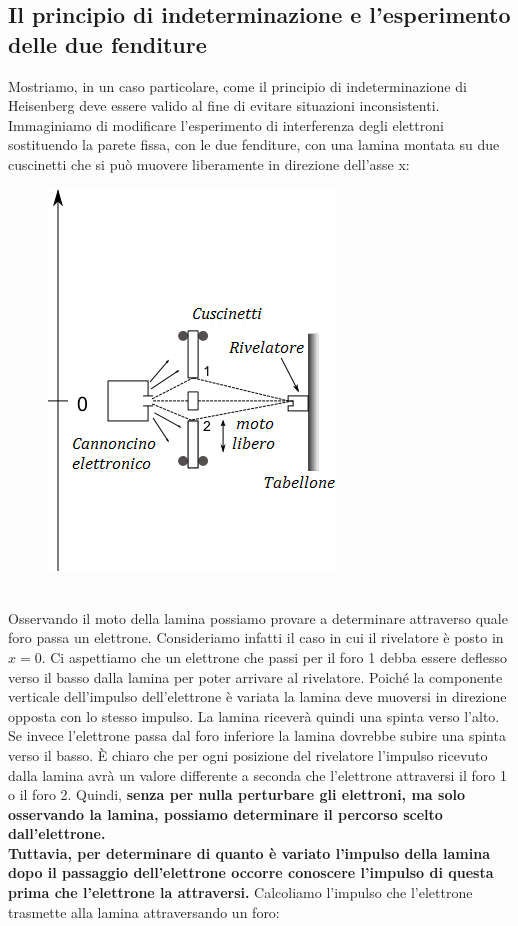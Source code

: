 \subsection{Il principio di indeterminazione e l'esperimento delle due fenditure}
Mostriamo, in un caso particolare, come il principio di indeterminazione di Heisenberg deve essere valido al fine di evitare situazioni inconsistenti.\\
Immaginiamo di modificare l'esperimento di interferenza degli elettroni sostituendo la parete fissa, con le due fenditure, con una lamina montata su due cuscinetti che si può muovere liberamente in direzione dell'asse x:
\begin{figure}[!htbp]
\begin{center}
\includegraphics[width=.5\textwidth]{immagini/cap_2/fig_2_5.png}
\end{center}
\end{figure}\\
Osservando il moto della lamina possiamo provare a determinare attraverso quale foro passa un elettrone. Consideriamo infatti il caso in cui il rivelatore è posto in $x=0$. Ci aspettiamo che un elettrone che passi per il foro 1 debba essere deflesso verso il basso dalla lamina per poter arrivare al rivelatore. Poiché la componente verticale dell'impulso dell'elettrone è variata la lamina deve muoversi in direzione opposta con lo stesso impulso. La lamina riceverà quindi una spinta verso l'alto. Se invece l'elettrone passa dal foro inferiore la lamina dovrebbe subire una spinta verso il basso. È chiaro che per ogni posizione del rivelatore l'impulso ricevuto dalla lamina avrà un valore differente a seconda che l'elettrone attraversi il foro 1 o il foro 2. Quindi, \textbf{senza per nulla perturbare gli elettroni, ma solo osservando la lamina, possiamo determinare il percorso scelto dall'elettrone.\\
Tuttavia, per determinare di quanto è variato l'impulso della lamina dopo il passaggio dell'elettrone occorre conoscere l'impulso di questa prima che l'elettrone la attraversi.} Calcoliamo l'impulso che l'elettrone trasmette alla lamina attraversando un foro:\\
